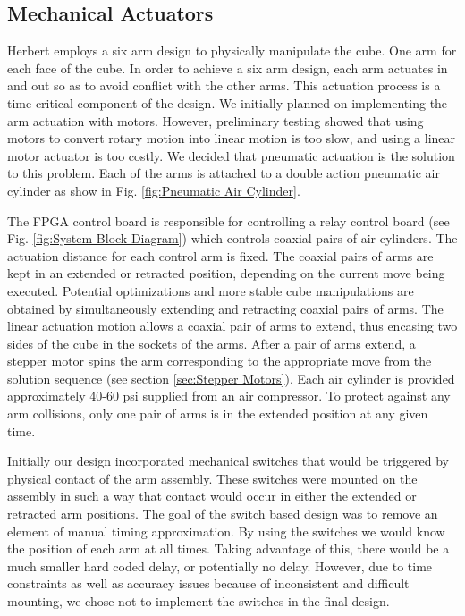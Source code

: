 \documentclass[final, letterpaper, 10 pt, conference, twocolumn]{IEEEtran}
\begin{document}
\subsection{Mechanical Actuators}
\label{sec:Mechanical Actuators}
Herbert employs a six arm design to physically manipulate the cube. One arm for each face of the cube. In order to achieve a six arm design, each arm actuates in and out so as to avoid conflict
with the other arms. This actuation process is a time critical component of
the design.  We initially planned on implementing the
arm actuation with motors.  However, preliminary testing showed that using
motors to convert rotary motion into linear motion is too slow, and using a linear motor
actuator is too costly. We decided that pneumatic actuation is the solution to this problem.  Each of the arms is attached to a double action pneumatic air cylinder as show in Fig. \ref{fig:Pneumatic Air Cylinder}.

The FPGA control board is responsible for controlling a relay control board (see Fig. \ref{fig:System Block Diagram}) which controls coaxial pairs of air cylinders. The actuation distance for each control arm is fixed. The coaxial pairs of arms are kept in an extended or retracted position, depending on the current move being executed. Potential optimizations and more stable cube manipulations  are obtained by simultaneously extending and retracting coaxial pairs of arms. The linear actuation motion allows a coaxial pair of
arms to extend, thus encasing two sides of the cube in the sockets of the arms. After a pair of arms extend,
a stepper motor spins the arm corresponding to the appropriate move from the solution sequence (see section \ref{sec:Stepper Motors}). Each air cylinder is provided approximately 40-60 psi supplied from an air compressor. To protect against any arm collisions, only one pair of arms is in the extended position at any given time.

Initially our design incorporated mechanical switches that would be triggered by physical contact of the arm assembly.  These switches were mounted on the assembly in such a way that contact would occur in either the extended or retracted arm positions.  The goal of the switch based design was to remove an element of manual timing approximation.  By using the switches we would know the position of each arm at all times.  Taking advantage of this, there would be a much smaller hard coded delay, or potentially no delay.  However, due to time constraints as well as accuracy issues because of inconsistent and difficult mounting, we chose not to implement the switches in the final design.   
 
\end{document}
